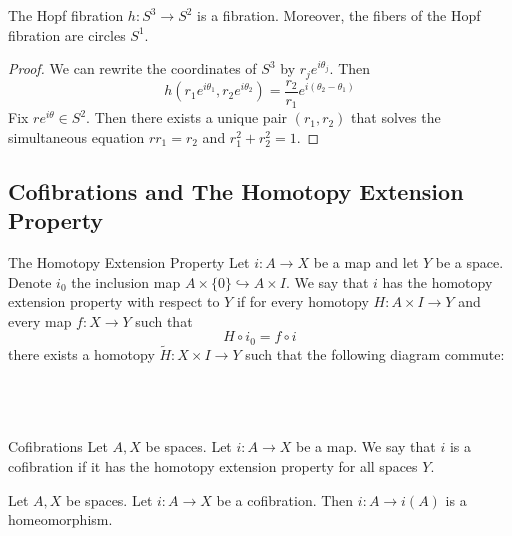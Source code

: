 \documentclass[a4paper]{article}
\begin{document}
\begin{eg}{}{} The Hopf fibration $h:S^3\to S^2$ is a fibration. Moreover, the fibers of the Hopf fibration are circles $S^1$. \tcbline
\begin{proof}
We can rewrite the coordinates of $S^3$ by $r_je^{i\theta_j}$. Then $$h(r_1e^{i\theta_1},r_2e^{i\theta_2})=\frac{r_2}{r_1}e^{i(\theta_2-\theta_1)}$$ Fix $re^{i\theta}\in S^2$. Then there exists a unique pair $(r_1,r_2)$ that solves the simultaneous equation $rr_1=r_2$ and $r_1^2+r_2^2=1$. 
\end{proof}
\end{eg}

\subsection{Cofibrations and The Homotopy Extension Property}
\begin{defn}{The Homotopy Extension Property}{} Let $i:A\to X$ be a map and let $Y$ be a space. Denote $i_0$ the inclusion map $A\times\{0\}\hookrightarrow A\times I$. We say that $i$ has the homotopy extension property with respect to $Y$ if for every homotopy $H:A\times I\to Y$ and every map $f:X\to Y$ such that $$H\circ i_0=f\circ i$$ there exists a homotopy $\widetilde{H}:X\times I\to Y$ such that the following diagram commute: \\~\\
\\~\\
\end{defn}

\begin{defn}{Cofibrations}{} Let $A,X$ be spaces. Let $i:A\to X$ be a map. We say that $i$ is a cofibration if it has the homotopy extension property for all spaces $Y$. 
\end{defn}

\begin{prp}{}{} Let $A,X$ be spaces. Let $i:A\to X$ be a cofibration. Then $i:A\to i(A)$ is a homeomorphism. 
\end{prp}
\end{document}
